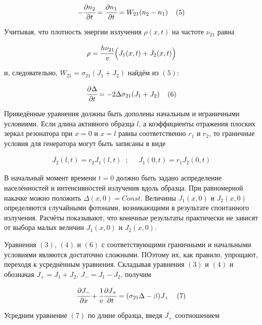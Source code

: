 \documentclass[a4paper,14pt,russian]{article}
\begin{document}
\begin{eqnarray}
- \cfrac {\partial n_2} {\partial t} = \cfrac {\partial n_1} {\partial t} = W_{21} (n_2 - n_1) \;\;\;\; (5)
\end{eqnarray}

Учитывая, что плотность энергии излучения $\rho(x, t)$ на частоте $\nu_{21}$ равна

\begin{eqnarray}
\rho = \cfrac {h \nu_{21}} {v} \Big( J_1 (x, t) + J_2 (x, t) \Big)
\end{eqnarray}

и, следовательно, $W_{21} = \sigma_{21} (J_1 + J_2)$ найдём из $(5)$:

\begin{eqnarray}
\cfrac {\partial \Delta} {\partial t} = -2 \Delta \sigma_{21} (J_1 + J_2) \;\;\;\;(6)
\end{eqnarray}

Приведённые уравнения должны быть дополены начальным и играничными условиями. Если длина активного образца $l$, а коэффициенты отражения плоских зеркал резонатора при $x = 0$ и $x = l$ равны соответственно $r_1$ и $r_2$, то граничные условия для генератора могут быть записаны в виде

\begin{eqnarray}
J_2(l, t) = r_2 J_1(l, t) \;\; ; \;\;\;\;\; J_1(0, t) = r_1 J_2(0, t)
\end{eqnarray}

В начальный момент времени $t = 0$ должно быть задано аспределение населённостей и интенсивностей излучения вдоль образца. При равномерной накачке можно положить $\Delta(x, 0) = Const$. Величины $J_1(x, 0)$ и $J_2(x, 0)$ определяются случайными фотонами, возникающими в результате спонтанного излучения. Расчёты показывают, что конечные результаты практически не зависят от выбора малых величин $J_1(x, 0)$ и $J_2(x, 0)$.

Уравнения $(3)$, $(4)$ и $(6)$ с соответствующими граничными и начальными условиями являются достаточно сложными. ПОэтому их, как правило, упрощают, переходя к усреднённым уравнения. Складывая уравнения $(3)$ и $(4)$ и обозначая $J_+ = J_1 + J_2$, $J_- = J_1 - J_2$, получим

\begin{eqnarray}
\cfrac {\partial J_-} {\partial x} + \cfrac {1} {v} \cfrac {\partial J_+} {\partial t} = (\sigma_{21} \Delta - \beta) J_+ \;\;\;\; (7)
\end{eqnarray}

Усредним уравнение $(7)$ по длине образца, введя $\overline{J_+}$ соотношением
\end{document}
